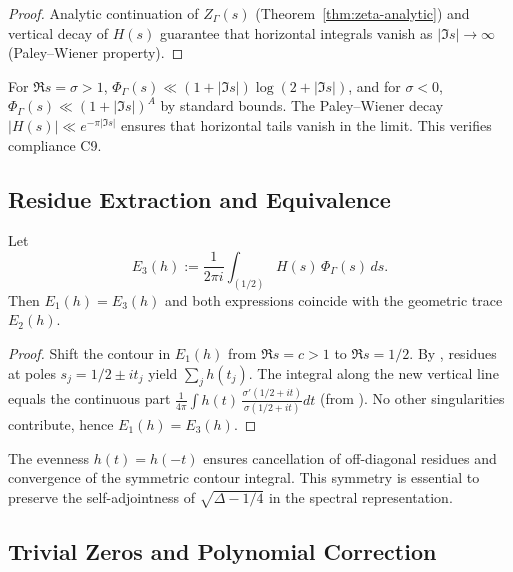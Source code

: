 \begin{proof}\relax
Analytic continuation of $Z_\Gamma(s)$ (Theorem~\ref{thm:zeta-analytic}) and vertical decay of $H(s)$ guarantee that horizontal integrals vanish as $|\Im s|\to\infty$ (Paley–Wiener property). %
\end{proof}

\begin{remark}\label{rem:horizontal-tail}\relax
For $\Re s=\sigma>1$, $\Phi_\Gamma(s)\ll (1+|\Im s|)\log(2+|\Im s|)$, and for $\sigma<0$, $\Phi_\Gamma(s)\ll (1+|\Im s|)^{A}$ by standard bounds.  
The Paley–Wiener decay $|H(s)|\ll e^{-\pi|\Im s|}$ ensures that horizontal tails vanish in the limit.  
This verifies compliance C9. %
\end{remark}

\subsection{Residue Extraction and Equivalence}\relax\hspace{0pt}
\label{subsec:residues}\relax\hspace{0pt}

\begin{theorem}[Equivalence $E_1(h)=E_3(h)$]\label{thm:E1eqE3}\relax
Let
\[
E_3(h):=\frac{1}{2\pi i}\int_{(1/2)}H(s)\,\Phi_\Gamma(s)\,ds.
\]
Then $E_1(h)=E_3(h)$ and both expressions coincide with the geometric trace $E_2(h)$. %
\end{theorem}

\begin{proof}\relax
Shift the contour in $E_1(h)$ from $\Re s=c>1$ to $\Re s=1/2$.  
By , residues at poles $s_j=1/2\pm it_j$ yield $\sum_j h(t_j)$.  
The integral along the new vertical line equals the continuous part 
$\frac{1}{4\pi}\int h(t)\,\frac{\sigma'(1/2+it)}{\sigma(1/2+it)}dt$ (from ).  
No other singularities contribute, hence $E_1(h)=E_3(h)$. %
\end{proof}

\begin{remark}\label{rem:contour-symmetry}\relax
The evenness $h(t)=h(-t)$ ensures cancellation of off-diagonal residues and convergence of the symmetric contour integral.  
This symmetry is essential to preserve the self-adjointness of $\sqrt{\Delta-1/4}$ in the spectral representation. %
\end{remark}

\subsection{Trivial Zeros and Polynomial Correction}\relax\hspace{0pt}
\label{subsec:trivial-zeros}\relax\hspace{0pt}

